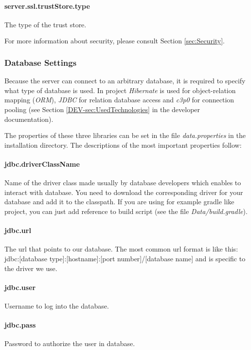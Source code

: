 \paragraph{server.ssl.trustStore.type}
The type of the trust store.

\vspace{0.75cm}
For more information about security, please consult Section \ref{sec:Security}.

\subsubsection{Database Settings}
\label{sssec:DataSettings}

Because the server can connect to an arbitrary database, it is required to
specify what type of database is used. In \textan{} project \emph{Hibernate}
is used for object-relation mapping (\emph{ORM}), \emph{JDBC} for relation
database access and \emph{c3p0} for connection pooling (see Section
\ref{DEV-sec:UsedTechnologies} in the developer documentation).

The properties of these three libraries can be set in the file
\emph{data.properties} in the installation directory. The descriptions of the
most important properties follow:

\paragraph{jdbc.driverClassName}
Name of the driver class made usually by database developers which enables to
interact with database. You need to download the corresponding driver for your database and add it to the classpath. If you are using for example gradle like \textan{} project, you can just add reference to build script (see the file \emph{Data/build.gradle}).

\paragraph{jdbc.url}
 The url that points to our database. The most common url format is like this:
jdbc:[database type]:[hostname]:[port number]/[database name]
and is specific to the driver we use.

\paragraph{jdbc.user}
Username to log into the database.

\paragraph{jdbc.pass}
Password to authorize the user in database.

